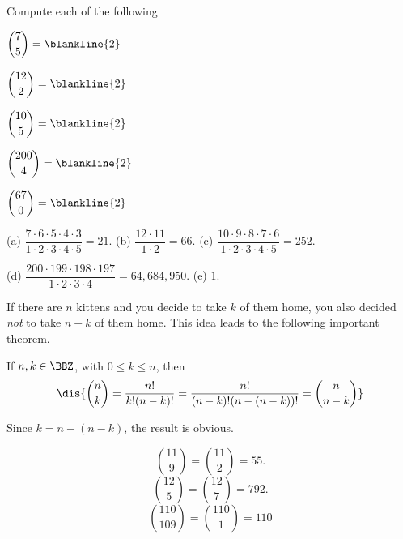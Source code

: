 \begin{exer}
Compute each of the following
\begin{lenum}
\item
$\displaystyle\binom{7}{5} =\blankline{2}$
\item
 $\displaystyle\binom{12}{2}  = \blankline{2}$
\item 
 $\displaystyle\binom{10}{5} =\blankline{2}$
\item
$\displaystyle\binom{200}{4} = \blankline{2}$
\item
$\displaystyle\binom{67}{0} = \blankline{2}$
\end{lenum}
\begin{answer}
(a) $\dfrac{7\cdot 6\cdot 5 \cdot 4\cdot 3}{1\cdot 2\cdot 3\cdot 4 \cdot 5} = 21$.
(b) $\dfrac{12\cdot 11}{1\cdot 2} = 66$.
(c) $\dfrac{10\cdot 9\cdot 8\cdot 7\cdot 6}{1\cdot 2\cdot 3\cdot 4 \cdot 5} = 252$.

\noindent
(d) $\dfrac{200\cdot 199\cdot 198\cdot 197}{1\cdot 2\cdot 3\cdot 4} =64,684,950$.
(e) $1$.
\end{answer}
\end{exer}

If there are $n$ kittens and you decide to take $k$ of them home, you also
decided {\em not} to take $n-k$ of them home.  This idea leads to the following 
important theorem.
\begin{thm}\label{thm:binomminus}
If $n, k\in \BBZ$, with $0 \leq k\leq n$, then
$$\dis{\binom{n}{k} = \frac{n!}{k!(n - k)!} = \frac{n!}{(n-k)!(n -
(n-k))!} = \binom{n}{n - k}}$$
\begin{pf}
Since $k=n-(n-k)$, the result is obvious.
\end{pf}
\end{thm}

\begin{exa}
$$\binom{11}{9} = \binom{11}{2} = 55.$$
$$\binom{12}{5} = \binom{12}{7} = 792.$$
$$\binom{110}{109} = \binom{110}{1}  =  110$$ 
\end{exa}


